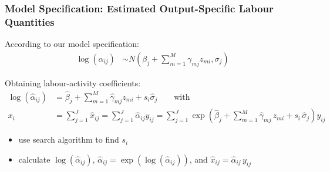 \documentclass[t,24pt,aspectratio=169]{beamer}
\begin{document}
\begin{frame}[hvid]
\frametitle{\vspace{-3ex}Model Specification: Estimated Output-Specific Labour Quantities}
According to our model specification:\\[-5ex]
\begin{align*}
\log \left( \alpha_{ij} \right)
& \sim N \left( \beta_j + \sum_{m=1}^M \gamma_{mj} z_{mi}, \sigma_j \right)
\end{align*}

Obtaining labour-activity coefficients:\\[-5ex]
\begin{align*}
\log \left( \hat{\alpha}_{ij} \right)
& = \hat{\beta}_j + \sum_{m=1}^M \hat{\gamma}_{mj} z_{mi} + s_i \hat{\sigma}_j \qquad \text{with} \\
x_i
& = \sum_{j=1}^J \hat{x}_{ij}
= \sum_{j=1}^J \hat{\alpha}_{ij} y_{ij}
= \sum_{j=1}^J \exp \left( \hat{\beta}_{j} + \sum_{m=1}^M \hat{\gamma}_{mj} \, z_{mi} + s_i \, \hat{\sigma}_{j} \right) y_{ij}
\end{align*}

\begin{itemize}
\item use search algorithm to find $s_i$
\item calculate $\log \left( \hat{\alpha}_{ij} \right)$,
$\hat{\alpha}_{ij} = \exp \left( \log \left( \hat{\alpha}_{ij} \right) \right)$, 
and $\hat{x}_{ij} = \hat{\alpha}_{ij} \, y_{ij}$
\end{itemize}
\end{frame}

\end{document}
